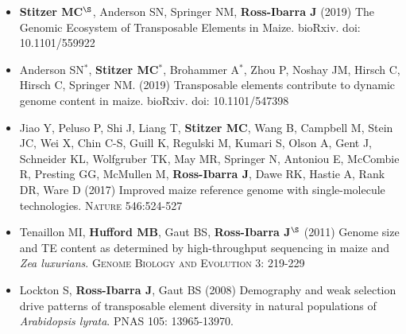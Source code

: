 \documentclass[10pt]{article}
\begin{document}
\begin{itemize} \setlength{\itemsep}{0pt} \setlength{\parskip}{2pt} \setlength{\parsep}{0pt}




\item \textbf{Stitzer MC}$^\S$, Anderson SN, Springer NM, \textbf{Ross-Ibarra J} (2019) The Genomic Ecosystem of Transposable Elements in Maize. bioRxiv. doi: 10.1101/559922

\item   Anderson SN$^*$, \textbf{Stitzer MC}$^*$,  Brohammer A$^*$, Zhou P, Noshay JM,  Hirsch C,   Hirsch C,  Springer NM. (2019) Transposable elements contribute to dynamic genome content in maize. bioRxiv. doi: 10.1101/547398

\item  Jiao Y, Peluso P,  Shi J,  Liang T, {\bf Stitzer MC}, Wang B,  Campbell M, Stein JC,  Wei X,  Chin C-S,  Guill K,  Regulski M,  Kumari S,  Olson A,  Gent J, Schneider KL,  Wolfgruber TK, May MR, Springer N,  Antoniou E,  McCombie R, Presting GG,  McMullen M, {\bf Ross-Ibarra J}, Dawe RK,  Hastie A, Rank DR, Ware D (2017) Improved maize reference genome with single-molecule technologies. \textsc{Nature}  546:524-527

\item Tenaillon MI, {\bf Hufford MB}, Gaut BS, {\bf Ross-Ibarra J}$^\S$ (2011)  Genome size and TE content as determined by high-throughput sequencing in maize and \emph{Zea luxurians}.  \textsc{Genome Biology and Evolution } 3: 219-229

\item Lockton S, {\bf Ross-Ibarra J}, Gaut BS (2008) Demography and weak selection drive patterns of transposable element diversity in natural populations of \emph{Arabidopsis lyrata}. PNAS 105: 13965-13970.

\end{itemize}
\end{document}
